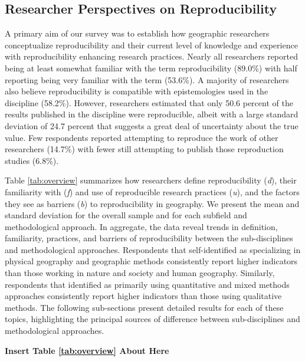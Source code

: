 \documentclass[]{interact}
\theoremstyle{plain}%
\theoremstyle{definition}
\theoremstyle{remark}
\begin{document}
\subsection*{Researcher Perspectives on Reproducibility}
A primary aim of our survey was to establish how geographic researchers conceptualize reproducibility and their current level of knowledge and experience with reproducibility enhancing research practices.
Nearly all researchers reported being at least somewhat familiar with the term reproducibility (89.0\%) with half reporting being very familiar with the term (53.6\%).
A majority of researchers also believe reproducibility is compatible with epistemologies used in the discipline (58.2\%). 
However, researchers estimated that only 50.6 percent of the results published in the discipline were reproducible, albeit with a large standard deviation of 24.7 percent that suggests a great deal of uncertainty about the true value. 
Few respondents reported attempting to reproduce the work of other researchers (14.7\%) with fewer still attempting to publish those reproduction studies (6.8\%). 

Table \ref{tab:overview} summarizes how researchers define reproducibility (\textit{d}), their familiarity with (\textit{f}) and use of reproducible research practices (\textit{u}), and the factors they see as barriers (\textit{b}) to reproducibility in geography. 
We present the mean and standard deviation for the overall sample and for each subfield and methodological approach.
In aggregate, the data reveal trends in definition, familiarity, practices, and barriers of reproducibility between the sub-disciplines and methodological approaches. 
Respondents that self-identified as specializing in physical geography and geographic methods consistently report higher indicators than those working in nature and society and human geography.
Similarly, respondents that identified as primarily using quantitative and mixed methods approaches consistently report higher indicators than those using qualitative methods.
The following sub-sections present detailed results for each of these topics, highlighting the principal sources of difference between sub-disciplines and methodological approaches.

\begin{center}
\textbf{Insert Table \ref{tab:overview} About Here}
\end{center}


\end{document}
